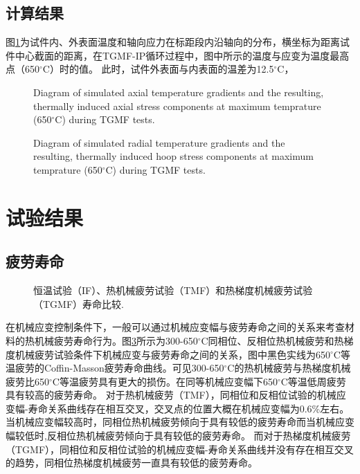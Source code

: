 \documentclass{article}
\begin{document}
\subsection{计算结果}
图\ref{Fig:plot_temperature_along_gauge_length}为试件内、外表面温度和轴向应力在标距段内沿轴向的分布，横坐标为距离试件中心截面的距离，在TGMF-IP循环过程中，图中所示的温度与应变为温度最高点（650$^{\circ}$C）时的值。
此时，试件外表面与内表面的温差为12.5$^{\circ}$C，


\begin{figure}[!htp]
\caption{Diagram of simulated axial temperature gradients and the resulting, thermally induced axial stress components at maximum temprature (650$^{\circ}$C) during TGMF tests.}
\label{Fig:plot_temperature_along_gauge_length}
\end{figure}


\begin{figure}[!htp]
\caption{Diagram of simulated radial temperature gradients and the resulting, thermally induced hoop stress components at maximum temprature (650$^{\circ}$C) during TGMF tests.}
\label{Fig:plot_temperature_along_radial_direction}
\end{figure}

\section{试验结果}
\subsection{疲劳寿命}

\begin{figure}[!htp]
\caption{恒温试验（IF）、热机械疲劳试验（TMF）和热梯度机械疲劳试验（TGMF）寿命比较.}
\label{Fig:plot_exp_fatigue_life}
\end{figure}

在机械应变控制条件下，一般可以通过机械应变幅与疲劳寿命之间的关系来考查材料的热机械疲劳寿命行为。图\ref{Fig:plot_exp_fatigue_life}所示为300-650$^{\circ}$C同相位、反相位热机械疲劳和热梯度机械疲劳试验条件下机械应变与疲劳寿命之间的关系，图中黑色实线为650$^{\circ}$C等温疲劳的Coffin-Masson疲劳寿命曲线。可见300-650$^{\circ}$C的热机械疲劳与热梯度机械疲劳比650$^{\circ}$C等温疲劳具有更大的损伤。在同等机械应变幅下650$^{\circ}$C等温低周疲劳具有较高的疲劳寿命。
对于热机械疲劳（TMF），同相位和反相位试验的机械应变幅-寿命关系曲线存在相互交叉，交叉点的位置大概在机械应变幅为0.6\%左右。
当机械应变幅较高时，同相位热机械疲劳倾向于具有较低的疲劳寿命而当机械应变幅较低时,反相位热机械疲劳倾向于具有较低的疲劳寿命。
而对于热梯度机械疲劳（TGMF），同相位和反相位试验的机械应变幅-寿命关系曲线并没有存在相互交叉的趋势，同相位热梯度机械疲劳一直具有较低的疲劳寿命。
\end{document}
